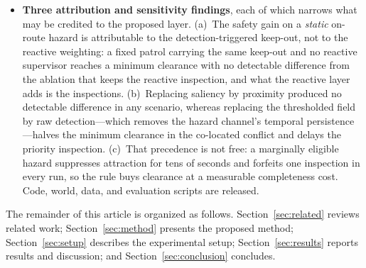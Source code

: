 \begin{itemize}
\item \textbf{Three attribution and sensitivity findings}, each of which narrows what
may be credited to the proposed layer. (a)~The safety gain on a \emph{static}
on-route hazard is attributable to the detection-triggered keep-out, not to the
reactive weighting: a fixed patrol carrying the same keep-out and no reactive
supervisor reaches a minimum clearance with no detectable difference from the
ablation that keeps the reactive inspection, and what the reactive layer adds is
the inspections. (b)~Replacing saliency by proximity produced no detectable difference in any
scenario, whereas replacing the thresholded field by raw detection---which removes the
hazard channel's temporal persistence---halves the minimum clearance in the co-located
conflict and delays the priority inspection.
(c)~That precedence is not free: a marginally eligible hazard suppresses attraction
for tens of seconds and forfeits one inspection in every run, so the rule buys
clearance at a measurable completeness cost. Code, world, data, and evaluation
scripts are released.
\end{itemize}

The remainder of this article is organized as follows.
Section~\ref{sec:related} reviews related work; Section~\ref{sec:method}
presents the proposed method; Section~\ref{sec:setup} describes the
experimental setup; Section~\ref{sec:results} reports results and discussion;
and Section~\ref{sec:conclusion} concludes.

